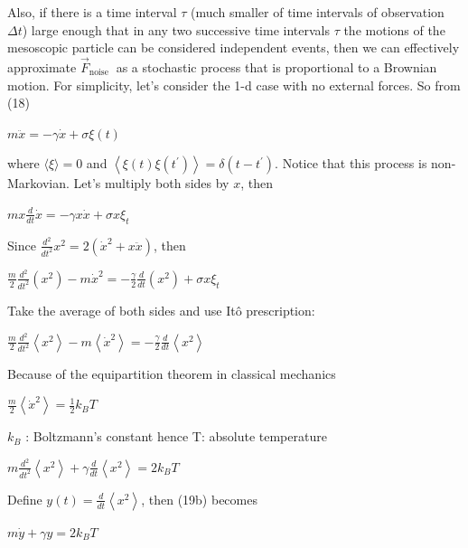 Also, if there is a time interval $\tau$ (much smaller of time intervals of
observation $\Delta t$) large enough that in any two successive time intervals
$\tau$ the motions of the mesoscopic particle can be considered independent
events, then we can effectively approximate $\vec{F}_{\text {noise }}$ as a
stochastic process that is proportional to a Brownian motion.
For simplicity, let's consider the 1-d case with no external forces. So from
(18)
\begin{DispWithArrows}[displaystyle, format=c]
  $m \ddot{x}=-\gamma \dot{x}+\sigma \xi(t)$
\end{DispWithArrows}
where $\langle\xi\rangle=0$ and
$\left\langle\xi(t) \xi\left(t^{\prime}\right)\right\rangle=\delta\left(t-t^{\prime}\right)$.
Notice that this process is non-Markovian. Let's multiply both sides by $x$,
then
\begin{DispWithArrows}[displaystyle, format=c]
  $m x \frac{d}{d t} \dot{x}=-\gamma x \dot{x}+\sigma x \xi_{t}$
\end{DispWithArrows}
Since $\frac{d^{2}}{d t^{2}} x^{2}=2\left(\dot{x}^{2}+x \ddot{x}\right)$, then
\begin{DispWithArrows}[displaystyle, format=c]
  $\frac{m}{2} \frac{d^{2}}{d t^{2}}\left(x^{2}\right)-m \dot{x}^{2}=-\frac{\gamma}{2} \frac{d}{d t}\left(x^{2}\right)+\sigma x \xi_{t}$
\end{DispWithArrows}
Take the average of both sides and use Itô prescription:
\begin{DispWithArrows}[displaystyle, format=c]
  $\frac{m}{2} \frac{d^{2}}{d t^{2}}\left\langle x^{2}\right\rangle-m\left\langle\dot{x}^{2}\right\rangle=-\frac{\gamma}{2} \frac{d}{d t}\left\langle x^{2}\right\rangle$
\end{DispWithArrows}
Because of the equipartition theorem in classical mechanics
\begin{DispWithArrows}[displaystyle, format=c]
  $\frac{m}{2}\left\langle\dot{x}^{2}\right\rangle=\frac{1}{2} k_{B} T$
\end{DispWithArrows}
$k_{B}$ : Boltzmann's constant
hence T: absolute temperature
\begin{DispWithArrows}[displaystyle, format=c]
  $m \frac{d^{2}}{d t^{2}}\left\langle x^{2}\right\rangle+\gamma \frac{d}{d t}\left\langle x^{2}\right\rangle=2 k_{B} T$
\end{DispWithArrows}
Define $y(t)=\frac{d}{d t}\left\langle x^{2}\right\rangle$, then (19b) becomes
\begin{DispWithArrows}[displaystyle, format=c]
  $m \dot{y}+\gamma y=2 k_{B} T$
\end{DispWithArrows}

